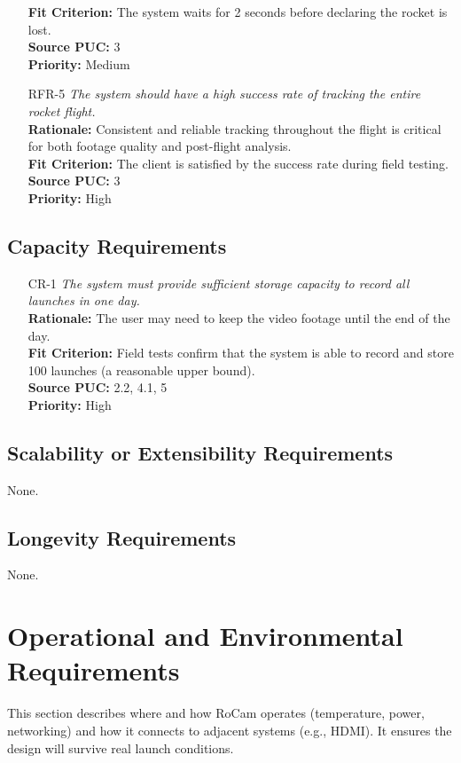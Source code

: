 \documentclass[12pt]{article}
\begin{document}
\begin{itemize}[leftmargin=*]
        \textbf{Fit Criterion:} The system waits for 2 seconds before declaring the rocket is lost.\\
        \textbf{Source PUC:} 3 \\
        \textbf{Priority:} Medium
  \item[RFR-5] \emph{The system should have a high success rate of tracking the entire
          rocket flight.}\\[2mm]
        \textbf{Rationale:} Consistent and reliable tracking throughout the flight is critical for both footage quality and post-flight analysis.\\
        \textbf{Fit Criterion:} The client is satisfied by the success rate during field testing.\\
        \textbf{Source PUC:} 3 \\
        \textbf{Priority:} High
\end{itemize}

\subsection{Capacity Requirements}
\begin{itemize}[leftmargin=*]
  \item[CR-1] \emph{The system must provide sufficient storage capacity to record all
          launches in one day.}\\[2mm]
        \textbf{Rationale:} The user may need to keep the video footage until the end of the day.\\
        \textbf{Fit Criterion:} Field tests confirm that the system is able to record and store 100 launches (a reasonable upper bound).\\
        \textbf{Source PUC:} 2.2, 4.1, 5 \\
        \textbf{Priority:} High
\end{itemize}

\subsection{Scalability or Extensibility Requirements}

None.

\subsection{Longevity Requirements}

None.

\section{Operational and Environmental Requirements}
This section describes where and how RoCam operates (temperature, power,
networking) and how it connects to adjacent systems (e.g., HDMI). It ensures
the design will survive real launch conditions.
\end{document}
